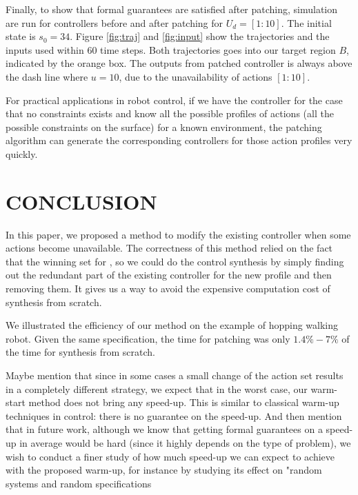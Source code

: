 Finally, to show that formal guarantees are satisfied after patching, simulation are run for controllers before and after patching for $ U_d =[1:10]$. The initial state is $ s_0=34 $. Figure \ref{fig:traj} and \ref{fig:input} show the trajectories and the inputs used within $ 60 $ time steps. Both trajectories goes into our target region $ B $, indicated by the orange box. The outputs from patched controller is always above the dash line where $ u=10 $, due to the unavailability of actions $[1:10] $.

For practical applications in robot control, if we have the controller for the case that no constraints exists and know all the possible profiles of actions (all the possible constraints on the surface) for a known environment, the patching algorithm can generate the corresponding controllers for those action profiles very quickly. 

\section{CONCLUSION}
In this paper, we proposed a method to modify the existing controller when some actions become unavailable. The correctness of this method relied on the fact that the winning set for , so we could do the control synthesis by simply finding out the redundant part of the existing controller for the new profile and then removing them. It gives us a way to avoid the expensive computation cost of synthesis from scratch. 

We illustrated the efficiency of our method on the example of hopping { \color{purple} walking} robot. Given the same specification, the time for patching was only $ 1.4\%-7\% $ of the time for synthesis from scratch. 

{\color{purple} Maybe mention that since in some cases a small change of the action set results in a completely different strategy, we expect that in the worst case, our warm-start method does not bring any speed-up. This is similar to classical warm-up techniques in control: there is no guarantee on the speed-up. And then mention that in future work, although we know that getting formal guarantees on a speed-up in average would be hard (since it highly depends on the type of problem), we wish to conduct a finer study of how much speed-up we can expect to achieve with the proposed warm-up, for instance by studying its effect on "random systems and random specifications}


